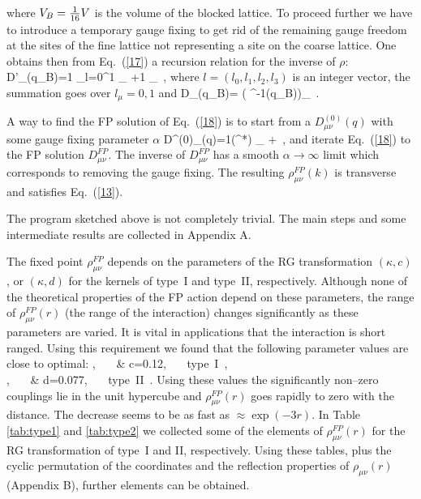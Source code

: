 where $V_B={1 \over 16} V$ is the volume of the blocked lattice. 
To proceed further we have
to introduce a temporary gauge fixing to get rid of the remaining
gauge freedom at the sites of the fine lattice not representing
a site on the coarse lattice.
One obtains then from Eq.~(\ref{17}) a recursion relation
for the inverse of $\rho$:
\bee
D'_{\mu \nu}(q_B)={1} \sum_{l=0}^1
_{\mu \nu} +{1\over \kappa} \delta_{\mu \nu} \,,      \label{18}
\ee
where $l=(l_0,l_1,l_2,l_3)$ is an integer vector, the summation
goes over $l_{\mu}=0,1$ and
\bee
D_{\mu \nu}(q_B)=
\left( \rho^{-1}(q_B)\right)_{\mu \nu} \,.            \label{19}
\ee

A way to find the FP solution of Eq.~(\ref{18}) is to start from
a $D^{(0)}_{\mu \nu}(q)$ with some gauge fixing parameter
$\alpha$
\bee
D^{(0)}_{\mu \nu}(q)={1\over (^*) } \delta_{\mu \nu}
+ \,,
                                                                   \label{20}
\ee
and iterate Eq.~(\ref{18}) to the FP solution
$D^{FP}_{\mu \nu}$. The inverse of $D^{FP}_{\mu \nu}$
has a smooth $\alpha \to \infty$ limit which corresponds to
removing the gauge fixing. The resulting 
$\rho^{FP}_{\mu \nu}(k)$ is transverse and satisfies
Eq.~(\ref{13}).

The program sketched above is not completely trivial.
The main steps and some intermediate results are collected in Appendix A.


The fixed point $\rho^{FP}_{\mu \nu}$ depends on the parameters of the
RG transformation $(\kappa,c)$, or $(\kappa,d)$ for the kernels of type~I
and type~II, respectively. Although none of the theoretical properties
of the FP action depend on these parameters, the range of 
$\rho^{FP}_{\mu \nu}(r)$ (the range of the interaction) changes 
significantly as these parameters are varied. It is vital in applications
that the interaction is short ranged. Using this requirement we
found that the following parameter values are close to optimal:
\beea
{},~~~ & c=0.12,~~~ {\rm type~I} \,,          \label{21} \\
,~~~ & d=0.077,~~~ {\rm type~II} \,. \nonumber 
\eea
Using these values the significantly non--zero couplings lie in
the unit hypercube and $\rho^{FP}_{\mu \nu}(r)$ goes rapidly
to zero with the distance. The decrease seems to be as fast as
$\approx\exp(-3r)$. In Table \ref{tab:type1} and 
\ref{tab:type2} we collected some of the 
elements of $\rho^{FP}_{\mu \nu}(r)$ for the RG transformation
of type~I and II, respectively. Using these tables, plus the
cyclic permutation of the coordinates and the reflection
properties of $\rho_{\mu \nu}(r)$ (Appendix B), further elements can
be obtained.

